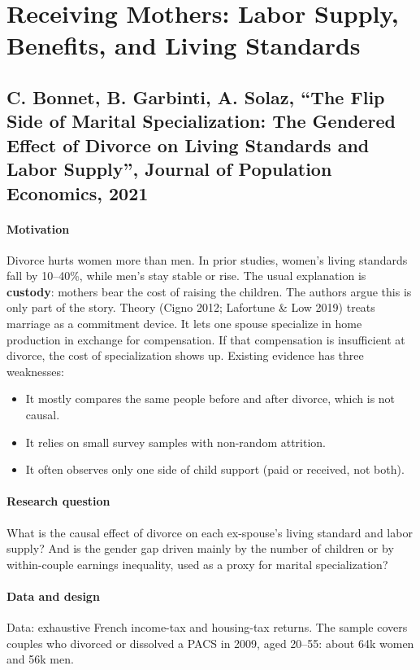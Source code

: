 \documentclass{article}
\begin{document}
\section{Receiving Mothers: Labor Supply, Benefits, and Living Standards}

\subsection{C. Bonnet, B. Garbinti, A. Solaz, ``The Flip Side of Marital Specialization: The Gendered Effect of Divorce on Living Standards and Labor Supply'', Journal of Population Economics, 2021}

\paragraph{Motivation} Divorce hurts women more than men. In prior studies, women’s living standards fall by 10–40\%, while men’s stay stable or rise.
The usual explanation is \textbf{custody}: mothers bear the cost of raising the children. The authors argue this is only part of the story.
Theory (Cigno 2012; Lafortune \& Low 2019) treats marriage as a commitment device. It lets one spouse specialize in home production in exchange for compensation. If that compensation is insufficient at divorce, the cost of specialization shows up.
Existing evidence has three weaknesses:
\begin{itemize}
    \item It mostly compares the same people before and after divorce, which is not causal.
    \item It relies on small survey samples with non-random attrition.
    \item It often observes only one side of child support (paid or received, not both).
\end{itemize}


\paragraph{Research question} What is the causal effect of divorce on each ex-spouse’s living standard and labor supply? And is the gender gap driven mainly by the number of children or by within-couple earnings inequality, used as a proxy for marital specialization?


\paragraph{Data and design} Data: exhaustive French income-tax and housing-tax returns. The sample covers couples who divorced or dissolved a PACS in 2009, aged 20–55: about 64k women and 56k men. \\
\end{document}

